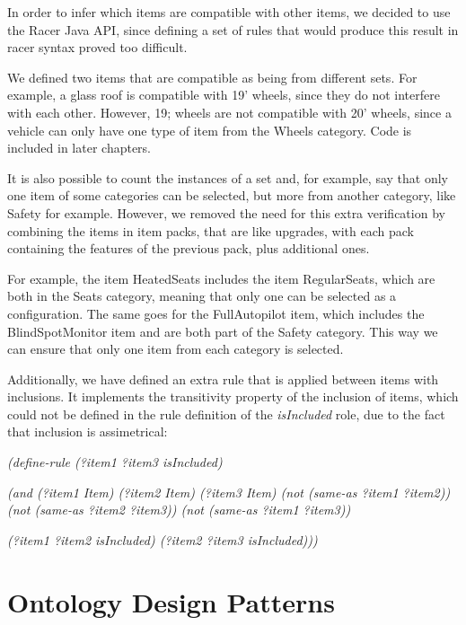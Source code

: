 \documentclass[a4paper,12pt]{report}
\begin{document}
\bigskip
In order to infer which items are compatible with other items, we decided to use the Racer Java API, since defining a set of rules that would produce this result in racer syntax proved too difficult.

We defined two items that are compatible as being from different sets. For example, a glass roof is compatible with 19' wheels, since they do not interfere with each other. However, 19; wheels are not compatible with 20' wheels, since a vehicle can only have one type of item from the Wheels category. Code is included in later chapters.  

\bigskip
It is also possible to count the instances of a set and, for example, say that only one item of some categories can be selected, but more from another category, like Safety for example. However, we removed the need for this extra verification by combining the items in item packs, that are like upgrades, with each pack containing the features of the previous pack, plus additional ones.

\bigskip
For example, the item HeatedSeats includes the item RegularSeats, which are both in the Seats category, meaning that only one can be selected as a configuration. The same goes for the FullAutopilot item, which includes the BlindSpotMonitor item and are both part of the Safety category. This way we can ensure that only one item from each category is selected.

\bigskip
Additionally, we have defined an extra rule that is applied between items with inclusions. It implements the transitivity property of the inclusion of items, which could not be defined in the rule definition of the \textit{isIncluded} role, due to the fact that inclusion is assimetrical:

\begin{center}

    \textit{(define-rule (?item1 ?item3 isIncluded)}
    
    \textit{(and (?item1 Item) (?item2 Item) (?item3 Item) (not (same-as ?item1 ?item2)) (not (same-as ?item2 ?item3)) (not (same-as ?item1 ?item3))}
    
    \textit{(?item1 ?item2 isIncluded) (?item2 ?item3 isIncluded))) }
    
\end{center} 

\chapter{Ontology Design Patterns}
\end{document}
